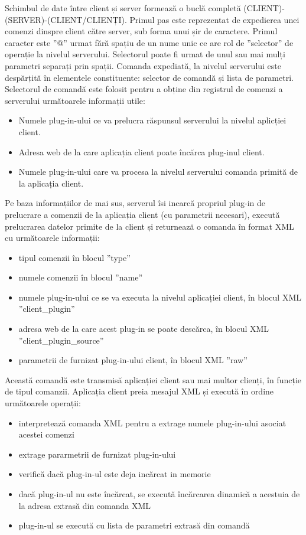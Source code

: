 \par Schimbul de date între client și server formează o buclă completă (CLIENT)-(SERVER)-(CLIENT/CLIENȚI). 
Primul pas este reprezentat de expedierea unei comenzi dinspre client către server, sub forma unui șir de caractere. Primul caracter este ”@” urmat fără spațiu de un nume unic ce are rol de ”selector” de operație la nivelul serverului. Selectorul poate fi urmat de unul sau mai mulți parametri separați prin spații. Comanda expediată, la nivelul serverului este despărțită în elementele constituente: selector de comandă și lista de parametri. Selectorul de comandă este folosit pentru a obține din registrul de comenzi a serverului următoarele informații utile:
\begin{itemize}
\item Numele plug-in-ului ce va prelucra răspunsul serverului la nivelul aplicției client.
\item Adresa web de la care aplicația client poate încărca plug-inul client.
\item Numele plug-in-ului care va procesa la nivelul serverului comanda primită de la aplicația client.
\end{itemize}
Pe baza informațiilor de mai sus, serverul îsi incarcă propriul plug-in de prelucrare a comenzii de la aplicația client (cu parametrii necesari), execută prelucrarea datelor primite de la client și returnează o comanda în format XML cu următoarele informații:

\begin{itemize}
\item tipul comenzii în blocul ”type”
\item numele comenzii în blocul ”name”
\item numele plug-in-ului ce se va executa la nivelul aplicației client, în blocul XML ”client\_plugin”
\item adresa web de la care acest plug-in se poate descărca, în blocul XML ”client\_plugin\_source”
\item parametrii de furnizat plug-in-ului client, în blocul XML ”raw”
\end{itemize}
Această comandă este transmisă aplicației client sau mai multor clienți, în funcție de tipul comanzii. Aplicația client preia mesajul XML și execută în ordine următoarele operații:

\begin{itemize}
\item interpretează comanda XML pentru a extrage numele plug-in-ului asociat acestei comenzi
\item extrage pararmetrii de furnizat plug-in-ului
\item verifică dacă plug-in-ul este deja incărcat in memorie 
\item dacă  plug-in-ul nu este încărcat, se execută încărcarea dinamică a acestuia de la adresa extrasă din comanda XML
\item plug-in-ul se execută cu lista de parametri extrasă din comandă
\end{itemize}

